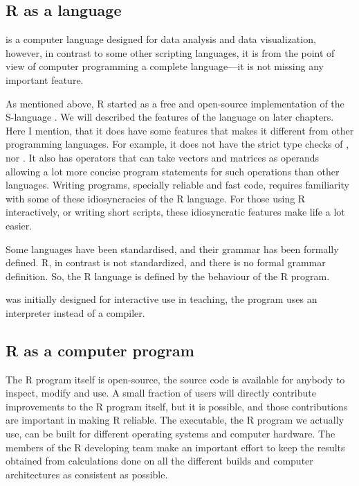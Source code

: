 \documentclass[krantz2,ChapterTOCs]{krantz}\usepackage{knitr}
\begin{document}
\subsection{R as a language}

 is a computer language designed for data analysis and data visualization, however, in contrast to some other scripting languages, it is from the point of view of computer programming a complete language---it is not missing any important feature.

As mentioned above, R started as a free and open-source implementation of the S-language \autocite{Becker1984,Becker1988}. We will described the features of the \Rlang language on later chapters. Here I mention, that it does have some features that makes it different from other programming languages. For example, it does not have the strict type checks of , nor  . It also has operators that can take vectors and matrices as operands allowing a lot more concise program statements for such operations than other languages. Writing programs, specially reliable and fast code, requires familiarity with some of these idiosyncracies of the R language. For those using R interactively, or writing short scripts, these idiosyncratic features make life a lot easier.

\begin{explainbox}
Some languages have been standardised, and their grammar has been formally defined. R, in contrast is not standardized, and there is no formal grammar definition. So, the R language is defined by the behaviour of the R program.
\end{explainbox}

 was initially designed for interactive use in teaching, the  program uses an interpreter instead of a compiler.

\subsection{R as a computer program}

The R program itself is open-source, the source code is available for anybody to inspect, modify and use. A small fraction of users will directly contribute improvements to the R program itself, but it is possible, and those contributions are important in making R reliable. The executable, the R program we actually use, can be built for different operating systems and computer hardware. The members of the R developing team make an important effort to keep the results obtained from calculations done on all the different builds and computer architectures as consistent as possible.
\end{document}

